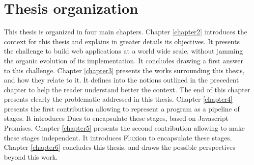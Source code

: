 \section{Thesis organization}

This thesis is organized in four main chapters.
Chapter \ref{chapter2} introduces the context for this thesis and explains in greater details its objectives.
It presents the challenge to build web applications at a world wide scale, without jamming the organic evolution of its implementation.
It concludes drawing a first answer to this challenge.
Chapter \ref{chapter3} presents the works surrounding this thesis, and how they relate to it.
It defines into the notions outlined in the precedent chapter to help the reader understand better the context.
The end of this chapter presents clearly the problematic addressed in this thesis.
Chapter \ref{chapter4} presents the first contribution allowing to represent a program as a pipeline of stages.
It introduces Dues to encapsulate these stages, based on Javascript Promises.
Chapter \ref{chapter5} presents the second contribution allowing to make these stages independent.
It introduces Fluxion to encapsulate these stages.
Chapter \ref{chapter6} concludes this thesis, and draws the possible perspectives beyond this work.
